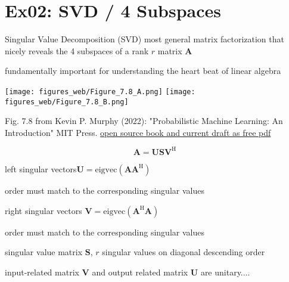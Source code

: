 \documentclass[mathserif, aspectratio=43]{intbeamer}
\begin{document}
\section{Ex02: SVD / 4 Subspaces}
\begin{frame}{Singular Value Decomposition (SVD)}
most general matrix factorization that nicely reveals the 4 subspaces of a rank $r$ matrix $\bm{A}$

fundamentally important for understanding the heart beat of linear algebra

\texttt{[image: figures\_web/Figure\_7.8\_A.png]}
\texttt{[image: figures\_web/Figure\_7.8\_B.png]}

\begin{footnotesize}Fig. 7.8 from Kevin P. Murphy (2022): "Probabilistic Machine Learning: An Introduction" MIT Press. \href{https://probml.github.io/pml-book/book1.html}{open source book and current draft as free pdf}\end{footnotesize}

$$\bm{A} = \bm{U} \bm{S} \bm{V}^\mathrm{H}$$

left singular vectors\quad$\bm{U} = \mathrm{eigvec}(\bm{A}\bm{A}^\mathrm{H})$
\begin{footnotesize}order must match to the corresponding singular values\end{footnotesize}

right singular vectors $\bm{V} = \mathrm{eigvec}(\bm{A}^\mathrm{H}\bm{A})$
\begin{footnotesize}order must match to the corresponding singular values\end{footnotesize}

singular value matrix $\bm{S}$, $r$ singular values on diagonal descending order

input-related matrix $\bm{V}$ and output related matrix $\bm{U}$ are unitary....


\end{frame}
\end{document}
